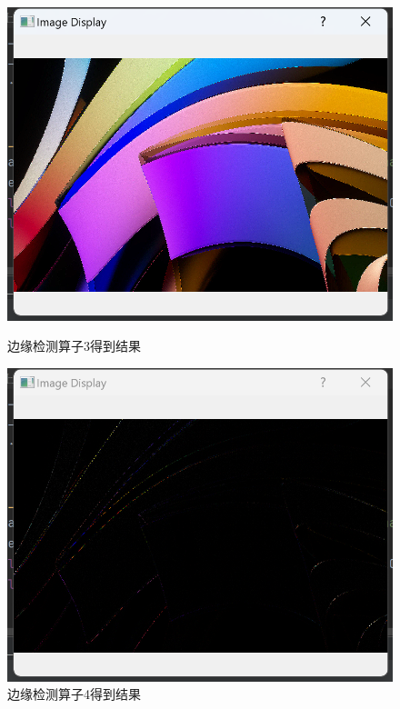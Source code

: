 \documentclass[a4paper,12pt]{article}
\begin{document}
\begin{figure}[htbp]
    \vspace{0.2cm}
    
    \begin{minipage}[b]{0.48\textwidth}
        \centering
        \includegraphics[width=\linewidth]{images/Design/image_processing/1/edge_3.png}
        \caption{边缘检测算子3得到结果}
    \end{minipage}
    \hfill
    \begin{minipage}[b]{0.48\textwidth}
        \centering
        \includegraphics[width=\linewidth]{images/Design/image_processing/1/edge_4.png}
        \caption{边缘检测算子4得到结果}
    \end{minipage}
\end{figure}
\end{document}
